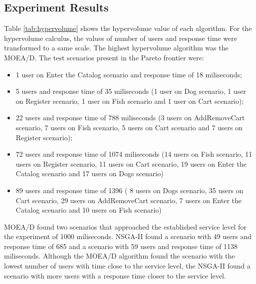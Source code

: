 \documentclass[espaco=umemeio,chapter=TITLE,twoside,openright]{abnt}
\begin{document}
\subsection{Experiment Results}

Table \ref{tab:hypervolume} shows the hypervolume value of each algorithm. For the hypervolume calculus, the values of number of users and response time were transformed to a same scale. The highest hypervolume algorithm was the MOEA/D. The test scenarios present in the Pareto frontier were:

\begin{itemize}
\item 1 user on Enter the Catalog scenario and response time of 18 miliseconds;
\item 5 users and response time of 35 miliseconds (1 user on Dog scenario, 1 user on Register scenario, 1 user on Fish scenario and 1 user on Cart scenario);
\item 22 users and response time of 788 miliseconds (3 users on AddRemoveCart scenario, 7 users on Fish scenario, 5 users on Cart scenario and 7 users on Register scenario);
\item 72 users and response time of 1074 miliseconds (14 users on Fish scenario, 11 users on Register scenario, 11 users on Cart scenario, 19 users on Enter the Catalog scenario and 17 users on Dogs scenario)
\item 89 users and response time of 1396 ( 8 users on Dogs scenario, 35 users on Cart scenario, 29 users on AddRemoveCart scenario, 7 users on Enter the Catalog scenario and 10 users on Fish scenario)

\end{itemize}

MOEA/D found two scenarios that approached the established service level for the experiment of 1000 miliseconds. NSGA-II  found a scenario with 49 users and response time of 685 and a scenario with 59 users and response time of 1138 miliseconds. Although the MOEA/D algorithm found the scenario with the lowest number of users with time close to the service level, the NSGA-II found a scenario with more users with a response time closer to the service level.
\end{document}
